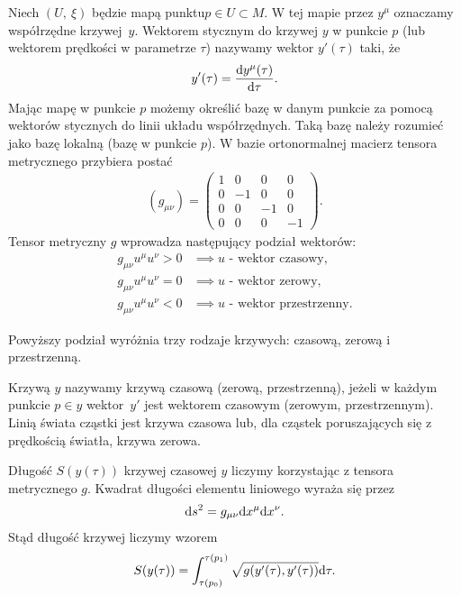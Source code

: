 \begin{definition}
Niech $(U,\ \xi)$ będzie mapą punktu$p\in U \subset M$. W tej mapie 
przez $y^\mu$ oznaczamy współrzędne krzywej~$y$.
Wektorem stycznym do krzywej $y$ w punkcie $p$  
(lub wektorem prędkości w 
parametrze $\tau$) nazywamy wektor $y'(\tau)$ taki, że
\begin{align*}
y' (\tau )= \frac{\text{d} y^\mu (\tau) }{\text{d} \tau}.
\end{align*}
Mając mapę w punkcie $p$ możemy określić bazę w danym punkcie
za pomocą wektorów stycznych do linii układu współrzędnych.
Taką bazę należy rozumieć jako bazę lokalną (bazę w punkcie $p$).
W bazie ortonormalnej macierz tensora metrycznego
przybiera postać 
\begin{align*}
( g_{\mu\nu} ) = \left(
\begin{array}{cccc}
1 & 0 & 0 & 0\\
0 & -1 & 0 & 0 \\
0 & 0 & -1 & 0 \\
0 & 0 & 0 & -1 
\end{array}
\right).
\end{align*}
Tensor metryczny $g$ wprowadza następujący podział wektorów:
\begin{align*}
g_{\mu\nu}u^\mu u^\nu > 0& \implies u \text{ - wektor czasowy,}\\
g_{\mu\nu}u^\mu u^\nu = 0& \implies u \text{ - wektor zerowy,}\\
g_{\mu\nu}u^\mu u^\nu < 0& \implies u \text{ - wektor przestrzenny.}
\end{align*}
\end{definition}
\noindent
Powyższy podział wyróżnia trzy rodzaje krzywych: czasową, 
zerową i przestrzenną.
\begin{definition}
Krzywą $y$ nazywamy krzywą czasową (zerową, przestrzenną),
jeżeli w każdym punkcie $p \in y$ wektor~$y'$ jest 
wektorem czasowym
(zerowym, przestrzennym). Linią świata cząstki
jest krzywa czasowa lub, dla cząstek 
poruszających się z prędkością światła, 
krzywa zerowa.
\end{definition}
Długość $S(y(\tau))$ krzywej czasowej $y$ liczymy 
korzystając z tensora metrycznego $g$. 
Kwadrat długości elementu liniowego wyraża się przez
\begin{align*}
\text{d} s^2 = g_{\mu\nu} \text{d} x^\mu \text{d} x^\nu.
\end{align*}
Stąd długość krzywej liczymy wzorem
\begin{align}\label{dlugosc_krzywej}
S( y(\tau) ) = \int_{\tau(p_0)}^{\tau(p_1)} \sqrt{g (
y' (\tau), y' (\tau) )} \text{d} \tau.
\end{align}
